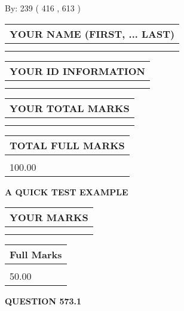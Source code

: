 \documentclass[12pt]{article}
\begin{document}
   
\hspace{1.0in} By: 
 239 ( 416 ,  613 )
   
   
   
   
\newpage 
\setcounter{page}{ 
   573001 } 
   
   
   
   
\noindent\begin{tabular}{|l|}
\hline
YOUR NAME (FIRST, ... LAST)  \\
\hline
 \\ 
 \\ 
\hline
\end{tabular}
\hspace{0.05in} \begin{tabular}{|l|}
\hline
 YOUR   ID   INFORMATION  \\
\hline
 \\ 
 \\ 
\hline
\end{tabular}
   
   
\vspace{0.2in}\noindent\begin{tabular}{|l|}
\hline
YOUR TOTAL MARKS  \\
\hline
 \\ 
 \\ 
\hline
\end{tabular}
\hspace{0.05in} \begin{tabular}{|l|}
\hline
TOTAL FULL MARKS  \\
\hline
 \\ 
100.00 \\
\hline
\end{tabular}
   
   
 \vspace{0.2in}
{\LARGE {\textbf{ A QUICK TEST EXAMPLE}}}
   
   
  
\vspace{0.2in}
  
\noindent\begin{tabular}{|l|}
\hline
 YOUR MARKS  \\
\hline
 \\ 
 \\ 
\hline
\end{tabular}
\hspace{0.05in} \begin{tabular}{|l|}
\hline
 Full Marks  \\
\hline
 \\ 
50.00 \\
\hline
\end{tabular}
{\textbf{\Large{QUESTION
573.1 
}}}
  
\end{document}
